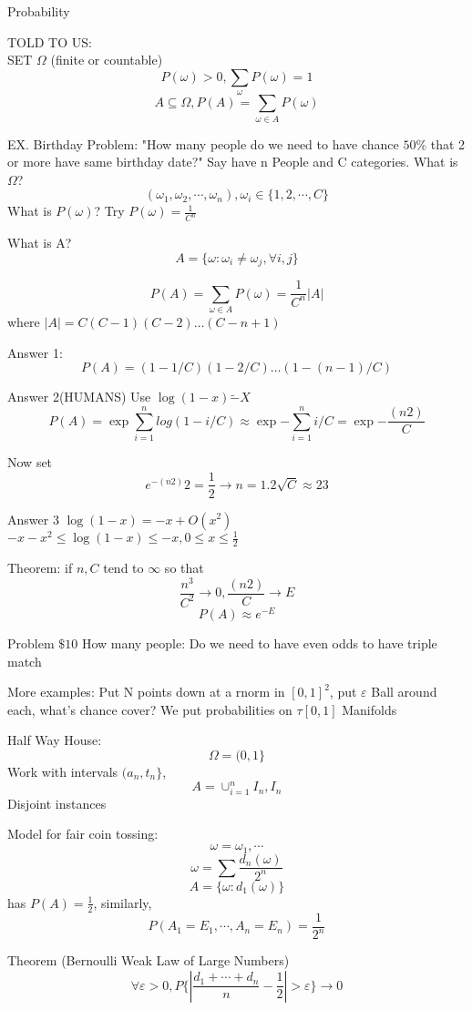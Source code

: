 \documentclass[a4paper,12pt]{article}
\begin{document}
Probability

TOLD TO US:\\
SET $\Omega$ (finite or countable)
\[
P(\omega) > 0, \sum_{\omega} P(\omega) = 1
\]
\[
	A \subseteq \Omega, P(A) = \sum_{\omega\in A} P(\omega)
\]

EX. Birthday Problem:
"How many people do we need to have chance $50\%$ that 2 or more have same birthday date?"
Say have n People and C categories.
What is $\Omega$?
\[
(\omega_1, \omega_2, \cdots, \omega_n), \omega_i \in \{1, 2, \cdots, C\}
\]
What is $P(\omega)$?
Try $P(\omega) = \frac{1}{C^n}$

What is A?
\[
A = \{\omega: \omega_i \neq \omega_j, \forall i, j\}
\]

\[
	P(A) = \sum_{\omega \in A} P(\omega) = \frac{1}{C^n} |A|
\]
where $|A| = C (C - 1) (C - 2) \ldots (C - n + 1)$

Answer 1:
\[
	P(A) = (1 - 1 / C)(1 - 2 / C) \ldots (1 - (n - 1) / C)
\]

Answer 2(HUMANS) Use $\log(1 - x) \tilde - X$
\[
	P(A) = \exp{\sum_{i = 1}^n log(1 - i / C)}
		\approx \exp{-\sum_{i = 1}^n i / C}
		= \exp{-\frac{(n 2)}{C}}
\]

Now set
\[
	e^{-(n 2)}{2} = \frac{1}{2} \rightarrow n = 1.2\sqrt{C} \approx 23
\]

Answer 3
$\log(1 - x) = -x + O(x^2)$
$-x - x^2 \leq \log(1 - x) \leq - x, 0 \leq x \leq \frac{1}{2}$

Theorem: if $n, C$ tend to $\infty$ so that
\[
\frac{n^3}{C^2} \rightarrow 0, \frac{(n 2)}{C} \rightarrow E
\]
\[
	P(A) \approx e^{-E}
\]

Problem $\$10$ How many people:
Do we need to have even odds to have triple match

More examples:
Put N points down at a rnorm in $[0, 1]^2$, put $\varepsilon$ Ball around each, what's chance cover?
We put probabilities on $\tau[0, 1]$
Manifolds

Half Way House:
\[
\Omega = (0, 1\}
\]
Work with intervals $(a_n, t_n\}$,
\[
	A = \cup_{i = 1}^n I_n, I_n
\]
Disjoint instances

Model for fair coin tossing:
\[
	\omega = \omega_1, \cdots
\]
\[
	\omega = \sum \frac{d_n(\omega)}{2^n}
\]
\[
	A = \{\omega: d_1(\omega)\}
\]
has $P(A) = \frac{1}{2}$, similarly,
\[
	P(A_1 = E_1, \cdots, A_n = E_n) = \frac{1}{2^n}
\]

Theorem (Bernoulli Weak Law of Large Numbers)
\[
	\forall \varepsilon > 0,
	P\{|\frac{d_1 + \cdots + d_n}{n} - \frac{1}{2}| > \varepsilon\} \rightarrow 0
\]
\end{document}
